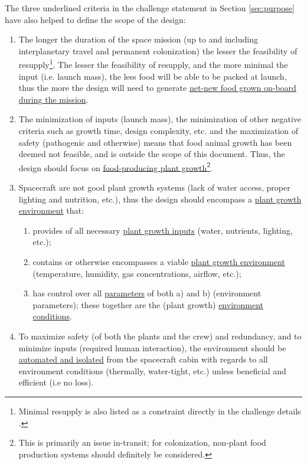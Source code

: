 \documentclass{../tex/report}
\begin{document}
The three underlined criteria in the challenge statement in Section \ref{sec:purpose} have also helped to define the scope of the design:
\begin{enumerate}[label=SC\arabic*., ref=SC\arabic*]
\item \label{sc:1} The longer the duration of the space mission (up to and including interplanetary travel and permanent colonization) the lesser the feasibility of
    resupply\footnote{Minimal resupply is also listed as a constraint directly in the challenge details \cite{applicantguide,dsfc-phase2}.}.
    The lesser the feasibility of resupply, and the more minimal the input (i.e. launch mass), the less food will be able to be packed at launch, thus the more the design will need to generate \uline{net-new food grown on-board during the mission}.
\item \label{sc:2} The minimization of inputs (launch mass), the minimization of other negative criteria such as growth time, design complexity, etc. and the maximization of safety (pathogenic and otherwise) means that food animal growth has been deemed not feasible, and is outside the scope of this document. Thus, the design should focus on \uline{food-producing plant
    growth}\footnote{This is primarily an issue in-transit; for colonization, non-plant food production systems should definitely be considered.}.
\item \label{sc:3} Spacecraft are not good plant growth systems (lack of water access, proper lighting and nutrition, etc.), thus the design should encompass a \uline{plant growth environment} that:
    \begin{enumerate}[label=SC3\alph*., ref=SC3\alph*]
        \item \label{sc:3a} provides of all necessary \uline{plant growth inputs} (water, nutrients, lighting, etc.);
        \item \label{sc:3b} contains or otherwise encompasses a viable \uline{plant growth environment} (temperature, humidity, gas concentrations, airflow, etc.);
        \item \label{sc:3c} has control over all \uline{parameters} of both a) and b) (environment parameters); these together are the (plant growth) \uline{environment conditions}.
    \end{enumerate}
\item \label{sc:4} To maximize safety (of both the plants and the crew) and redundancy, and to minimize inputs (required human interaction), the environment should be \uline{automated and isolated} from the spacecraft cabin with regards to all environment conditions (thermally, water-tight, etc.) unless beneficial and efficient (i.e no loss).

\end{enumerate}
\end{document}
